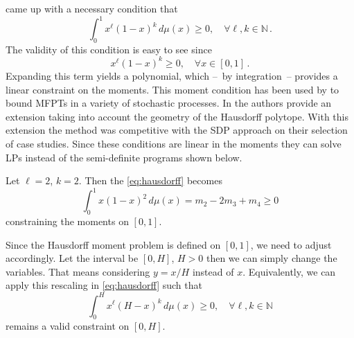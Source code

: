 \citet{hausdorff} came up with a necessary condition that
\begin{equation}\label{eq:hausdorff}
  \int_0^1 x^\ell(1-x)^k\,d\mu(x) \geq 0, \quad \forall \ell, k\in\mathbb{N}\,.
\end{equation}
The validity of this condition is easy to see since
\begin{equation}\label{eq:hausdorff_integrand}
  x^\ell(1-x)^k\geq 0, \quad \forall x\in[0,1]\,.
\end{equation}
Expanding this term yields a polynomial, which --~by integration~--
provides a linear constraint on the moments.
This moment condition has been used by \citet{helmes2001computing} to
bound \acp{MFPT} in a variety of stochastic processes.
In \citet{helmes2008geometrical} the authors provide an extension
taking into account the geometry of the Hausdorff polytope.
With this extension the method was competitive with the \ac{SDP}
approach on their selection of case studies.
Since these conditions are linear in the moments they can solve
\acp{LP} instead of the semi-definite programs shown below.

\begin{example}
  Let $\ell = 2$, $k=2$. Then the \eqref{eq:hausdorff} becomes
  \[
    \int_0^1 x (1 - x)^2 \,d\mu(x) =
    m_2 - 2 m_3 + m_4 \geq 0
  \]
  constraining the moments on $[0,1]$.
\end{example}

Since the Hausdorff moment problem is defined on $[0,1]$, we need to
adjust accordingly.
Let the interval be $[0,H]$, $H>0$ then we can simply change the variables.
That means considering $y=x/H$ instead of $x$.
Equivalently, we can apply this rescaling in \eqref{eq:hausdorff} such that
\begin{equation}\label{eq:hausdorff_scaled}
  \int_0^H x^\ell(H-x)^k\,d\mu(x) \geq 0, \quad \forall \ell, k\in\mathbb{N}
\end{equation}
remains a valid constraint on $[0,H]$.

